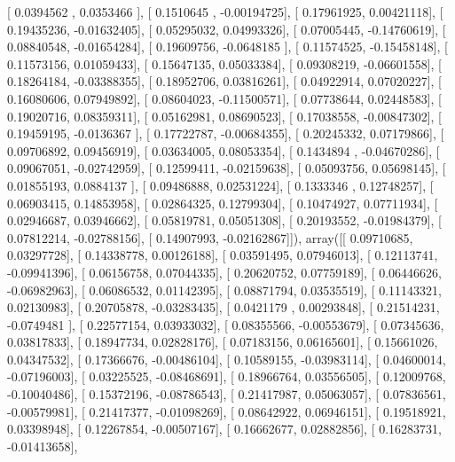 \documentclass{article}
\begin{document}
       [ 0.0394562 ,  0.0353466 ],
       [ 0.1510645 , -0.00194725],
       [ 0.17961925,  0.00421118],
       [ 0.19435236, -0.01632405],
       [ 0.05295032,  0.04993326],
       [ 0.07005445, -0.14760619],
       [ 0.08840548, -0.01654284],
       [ 0.19609756, -0.0648185 ],
       [ 0.11574525, -0.15458148],
       [ 0.11573156,  0.01059433],
       [ 0.15647135,  0.05033384],
       [ 0.09308219, -0.06601558],
       [ 0.18264184, -0.03388355],
       [ 0.18952706,  0.03816261],
       [ 0.04922914,  0.07020227],
       [ 0.16080606,  0.07949892],
       [ 0.08604023, -0.11500571],
       [ 0.07738644,  0.02448583],
       [ 0.19020716,  0.08359311],
       [ 0.05162981,  0.08690523],
       [ 0.17038558, -0.00847302],
       [ 0.19459195, -0.0136367 ],
       [ 0.17722787, -0.00684355],
       [ 0.20245332,  0.07179866],
       [ 0.09706892,  0.09456919],
       [ 0.03634005,  0.08053354],
       [ 0.1434894 , -0.04670286],
       [ 0.09067051, -0.02742959],
       [ 0.12599411, -0.02159638],
       [ 0.05093756,  0.05698145],
       [ 0.01855193,  0.0884137 ],
       [ 0.09486888,  0.02531224],
       [ 0.1333346 ,  0.12748257],
       [ 0.06903415,  0.14853958],
       [ 0.02864325,  0.12799304],
       [ 0.10474927,  0.07711934],
       [ 0.02946687,  0.03946662],
       [ 0.05819781,  0.05051308],
       [ 0.20193552, -0.01984379],
       [ 0.07812214, -0.02788156],
       [ 0.14907993, -0.02162867]]), array([[ 0.09710685,  0.03297728],
       [ 0.14338778,  0.00126188],
       [ 0.03591495,  0.07946013],
       [ 0.12113741, -0.09941396],
       [ 0.06156758,  0.07044335],
       [ 0.20620752,  0.07759189],
       [ 0.06446626, -0.06982963],
       [ 0.06086532,  0.01142395],
       [ 0.08871794,  0.03535519],
       [ 0.11143321,  0.02130983],
       [ 0.20705878, -0.03283435],
       [ 0.0421179 ,  0.00293848],
       [ 0.21514231, -0.0749481 ],
       [ 0.22577154,  0.03933032],
       [ 0.08355566, -0.00553679],
       [ 0.07345636,  0.03817833],
       [ 0.18947734,  0.02828176],
       [ 0.07183156,  0.06165601],
       [ 0.15661026,  0.04347532],
       [ 0.17366676, -0.00486104],
       [ 0.10589155, -0.03983114],
       [ 0.04600014, -0.07196003],
       [ 0.03225525, -0.08468691],
       [ 0.18966764,  0.03556505],
       [ 0.12009768, -0.10040486],
       [ 0.15372196, -0.08786543],
       [ 0.21417987,  0.05063057],
       [ 0.07836561, -0.00579981],
       [ 0.21417377, -0.01098269],
       [ 0.08642922,  0.06946151],
       [ 0.19518921,  0.03398948],
       [ 0.12267854, -0.00507167],
       [ 0.16662677,  0.02882856],
       [ 0.16283731, -0.01413658],
\end{document}
